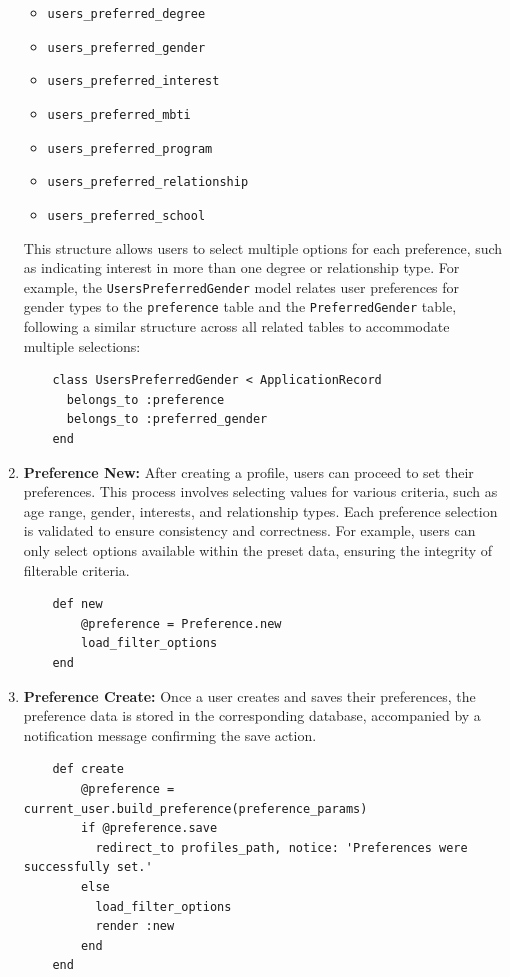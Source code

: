 \begin{enumerate}
    \begin{itemize}
        \item \texttt{users\_preferred\_degree}
        \item \texttt{users\_preferred\_gender}
        \item \texttt{users\_preferred\_interest}
        \item \texttt{users\_preferred\_mbti}
        \item \texttt{users\_preferred\_program}
        \item \texttt{users\_preferred\_relationship}
        \item \texttt{users\_preferred\_school}
    \end{itemize}
    \bigskip This structure allows users to select multiple options for each preference, such as indicating interest in more than one degree or relationship type. For example, the \texttt{UsersPreferredGender} model relates user preferences for gender types to the \texttt{preference} table and the \texttt{PreferredGender} table, following a similar structure across all related tables to accommodate multiple selections:
    \begin{lstlisting}
    class UsersPreferredGender < ApplicationRecord
      belongs_to :preference
      belongs_to :preferred_gender
    end
    \end{lstlisting}

    \item \textbf{Preference New:} 
    After creating a profile, users can proceed to set their preferences. This process involves selecting values for various criteria, such as age range, gender, interests, and relationship types. Each preference selection is validated to ensure consistency and correctness. For example, users can only select options available within the preset data, ensuring the integrity of filterable criteria.

    \begin{lstlisting}
    def new
        @preference = Preference.new
        load_filter_options
    end
    \end{lstlisting}

    \newpage
    \item \textbf{Preference Create:} 
    Once a user creates and saves their preferences, the preference data is stored in the corresponding database, accompanied by a notification message confirming the save action.
    \begin{lstlisting}
    def create
        @preference = current_user.build_preference(preference_params)
        if @preference.save
          redirect_to profiles_path, notice: 'Preferences were successfully set.'
        else
          load_filter_options
          render :new
        end
    end
    \end{lstlisting}


\end{enumerate}
